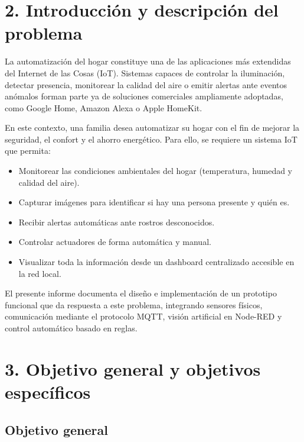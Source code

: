 \documentclass[12pt, a4paper]{report}
\begin{document}
\chapter*{2. Introducción y descripción del problema}

La automatización del hogar constituye una de las aplicaciones más extendidas del Internet de las Cosas (IoT). Sistemas capaces de controlar la iluminación, detectar presencia, monitorear la calidad del aire o emitir alertas ante eventos anómalos forman parte ya de soluciones comerciales ampliamente adoptadas, como Google Home, Amazon Alexa o Apple HomeKit.

En este contexto, una familia desea automatizar su hogar con el fin de mejorar la seguridad, el confort y el ahorro energético. Para ello, se requiere un sistema IoT que permita:

\begin{itemize}
  \item Monitorear las condiciones ambientales del hogar (temperatura, humedad y calidad del aire).
  \item Capturar imágenes para identificar si hay una persona presente y quién es.
  \item Recibir alertas automáticas ante rostros desconocidos.
  \item Controlar actuadores de forma automática y manual.
  \item Visualizar toda la información desde un dashboard centralizado accesible en la red local.
\end{itemize}

El presente informe documenta el diseño e implementación de un prototipo funcional que da respuesta a este problema, integrando sensores físicos, comunicación mediante el protocolo MQTT, visión artificial en Node-RED y control automático basado en reglas.

\chapter*{3. Objetivo general y objetivos específicos}

\section*{Objetivo general}
\end{document}
